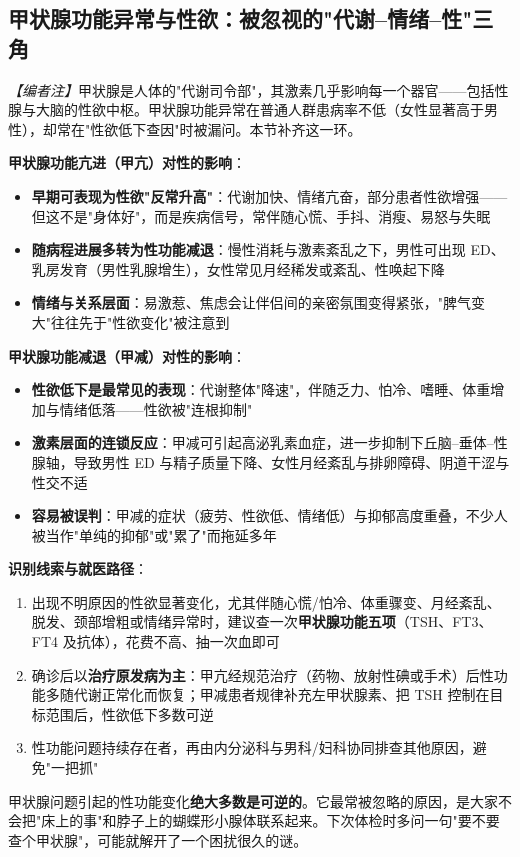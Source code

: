 \subsection{甲状腺功能异常与性欲：被忽视的"代谢--情绪--性"三角}

\noindent\textit{【编者注】}甲状腺是人体的"代谢司令部"，其激素几乎影响每一个器官——包括性腺与大脑的性欲中枢。甲状腺功能异常在普通人群患病率不低（女性显著高于男性），却常在"性欲低下查因"时被漏问。本节补齐这一环。

\vspace{0.5em}
\noindent\textbf{甲状腺功能亢进（甲亢）对性的影响}：

\begin{itemize}
	\item \textbf{早期可表现为性欲"反常升高"}：代谢加快、情绪亢奋，部分患者性欲增强——但这不是"身体好"，而是疾病信号，常伴随心慌、手抖、消瘦、易怒与失眠
	\item \textbf{随病程进展多转为性功能减退}：慢性消耗与激素紊乱之下，男性可出现 ED、乳房发育（男性乳腺增生），女性常见月经稀发或紊乱、性唤起下降
	\item \textbf{情绪与关系层面}：易激惹、焦虑会让伴侣间的亲密氛围变得紧张，"脾气变大"往往先于"性欲变化"被注意到
\end{itemize}

\vspace{0.5em}
\noindent\textbf{甲状腺功能减退（甲减）对性的影响}：

\begin{itemize}
	\item \textbf{性欲低下是最常见的表现}：代谢整体"降速"，伴随乏力、怕冷、嗜睡、体重增加与情绪低落——性欲被"连根抑制"
	\item \textbf{激素层面的连锁反应}：甲减可引起高泌乳素血症，进一步抑制下丘脑--垂体--性腺轴，导致男性 ED 与精子质量下降、女性月经紊乱与排卵障碍、阴道干涩与性交不适
	\item \textbf{容易被误判}：甲减的症状（疲劳、性欲低、情绪低）与抑郁高度重叠，不少人被当作"单纯的抑郁"或"累了"而拖延多年
\end{itemize}

\vspace{0.5em}
\noindent\textbf{识别线索与就医路径}：

\begin{enumerate}
	\item 出现不明原因的性欲显著变化，尤其伴随心慌/怕冷、体重骤变、月经紊乱、脱发、颈部增粗或情绪异常时，建议查一次\textbf{甲状腺功能五项}（TSH、FT3、FT4 及抗体），花费不高、抽一次血即可
	\item 确诊后以\textbf{治疗原发病为主}：甲亢经规范治疗（药物、放射性碘或手术）后性功能多随代谢正常化而恢复；甲减患者规律补充左甲状腺素、把 TSH 控制在目标范围后，性欲低下多数可逆
	\item 性功能问题持续存在者，再由内分泌科与男科/妇科协同排查其他原因，避免"一把抓"
\end{enumerate}

\begin{tcolorbox}[colback=pink!5!white,colframe=red!50!black,title=贴心小叮咛]
甲状腺问题引起的性功能变化\textbf{绝大多数是可逆的}。它最常被忽略的原因，是大家不会把"床上的事"和脖子上的蝴蝶形小腺体联系起来。下次体检时多问一句"要不要查个甲状腺"，可能就解开了一个困扰很久的谜。
\end{tcolorbox}

